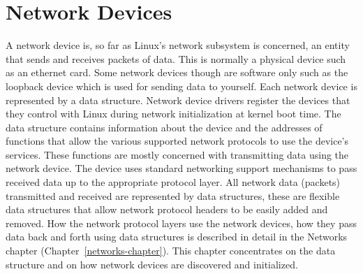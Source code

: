 \section{Network Devices}
A network device is, so far as Linux's network subsystem is concerned, an entity that sends and receives
packets of data.
This is normally a physical device such as an ethernet card.
Some network devices though are software only such as the loopback device which is used for sending data to
yourself.
Each network device is represented by a  data structure.
Network device drivers register the devices that they control with Linux during network initialization
at kernel boot time.
The  data structure contains information about the device and the addresses of functions that allow
the various supported network protocols to use the device's services.
These functions are mostly concerned with transmitting data using the network device.
The device uses standard networking support mechanisms to pass received data up to the appropriate protocol layer.
All network data (packets) transmitted and received are represented by  data structures, these are
flexible data structures that allow network protocol headers to be easily added and removed.
How the network protocol layers use the network devices, how they pass data back and forth using
 data structures is described in detail in the Networks chapter (Chapter~\ref{networks-chapter}).
This chapter concentrates on the  data structure and on how network devices are discovered
and initialized.


